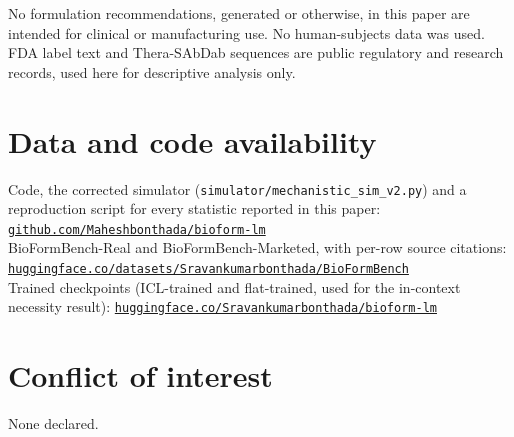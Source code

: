 \documentclass[twocolumn,10pt]{article}
\begin{document}
No formulation recommendations, generated or otherwise, in this paper are
intended for clinical or manufacturing use. No human-subjects data was used.
FDA label text and Thera-SAbDab sequences are public regulatory and research
records, used here for descriptive analysis only.

\section*{Data and code availability}
\label{sec:avail}
\noindent\raggedright\small
Code, the corrected simulator (\texttt{simulator/mechanistic\_sim\_v2.py}) and a
reproduction script for every statistic reported in this paper:
{\footnotesize\href{https://github.com/Maheshbonthada/bioform-lm}%
  {\nolinkurl{github.com/Maheshbonthada/bioform-lm}}}\\[2pt]
BioFormBench-Real and BioFormBench-Marketed, with per-row source citations:
{\footnotesize\href{https://huggingface.co/datasets/Sravankumarbonthada/BioFormBench}%
  {\nolinkurl{huggingface.co/datasets/Sravankumarbonthada/BioFormBench}}}\\[2pt]
Trained checkpoints (ICL-trained and flat-trained, used for the in-context
necessity result):
{\footnotesize\href{https://huggingface.co/Sravankumarbonthada/bioform-lm}%
  {\nolinkurl{huggingface.co/Sravankumarbonthada/bioform-lm}}}\par

\section*{Conflict of interest}
None declared.
\end{document}
